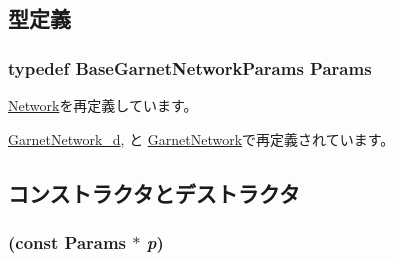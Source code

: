 \subsection{型定義}
\hypertarget{classBaseGarnetNetwork_a9b387eae2084a167c00ec5550159a245}{
\subsubsection[{Params}]{\setlength{\rightskip}{0pt plus 5cm}typedef BaseGarnetNetworkParams {\bf Params}}}
\label{classBaseGarnetNetwork_a9b387eae2084a167c00ec5550159a245}


\hyperlink{classNetwork_a5ebe6802acb5e6e05b54303c1004f080}{Network}を再定義しています。

\hyperlink{classGarnetNetwork__d_aa723bef17ce7ec9b7c3ad12002aef3bb}{GarnetNetwork\_\-d}, と \hyperlink{classGarnetNetwork_af1f02e00eac1bf3521780f99a28259a5}{GarnetNetwork}で再定義されています。

\subsection{コンストラクタとデストラクタ}
\hypertarget{classBaseGarnetNetwork_a20ea3960928fe0defff95bb03efc435f}{
\subsubsection[{BaseGarnetNetwork}]{ (const {\bf Params} $\ast$ {\em p})}}
\label{classBaseGarnetNetwork_a20ea3960928fe0defff95bb03efc435f}



